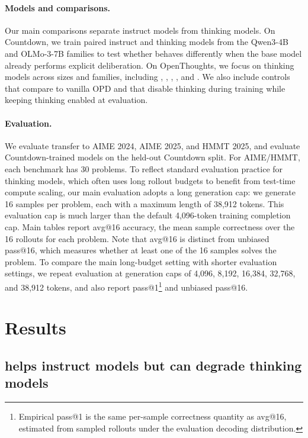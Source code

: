 \paragraph{Models and comparisons.}
Our main comparisons separate instruct models from thinking models. On
Countdown, we train paired instruct and thinking models from the Qwen3-4B
\citep{yang2025qwen3} and OLMo-3-7B \citep{olmo2025olmo3} families to test
whether \opsd{} behaves differently when the base model already performs
explicit deliberation. On OpenThoughts, we focus on thinking models across
sizes and families, including \qwenonesevenb{},
\qwenfourb{}, \qweneightb{}, \qwenfourbthink{}, and \olmosevenbthink{}. We also
include controls that compare \opsd{} to vanilla OPD and that disable thinking
during \opsd{} training while keeping thinking enabled at evaluation.

\paragraph{Evaluation.}
We evaluate transfer to AIME 2024, AIME 2025, and HMMT 2025, and evaluate
Countdown-trained models on the held-out Countdown split. For AIME/HMMT, each
benchmark has 30 problems. To reflect standard evaluation practice for thinking
models, which often uses long rollout budgets to benefit from test-time compute
scaling, our main evaluation adopts a long generation cap: we generate 16
samples per problem, each with a maximum length of 38,912 tokens. This
evaluation cap is much larger than the default 4,096-token training completion
cap. Main tables report avg@16 accuracy, the mean sample correctness over the
16 rollouts for each problem.
Note that avg@16 is distinct from unbiased
pass@16, which measures whether at least one of the 16 samples solves the
problem. To compare the main long-budget setting with shorter evaluation settings, we repeat evaluation at generation caps of 4,096, 8,192, 16,384, 32,768, and 38,912 tokens, and also report pass@1\footnote{Empirical pass@1 is the same per-sample correctness quantity as avg@16, estimated from sampled rollouts under the evaluation decoding distribution.} and unbiased pass@16.

\section{Results}
\label{sec:results}

\subsection{\opsd{} helps instruct models but can degrade thinking models}

